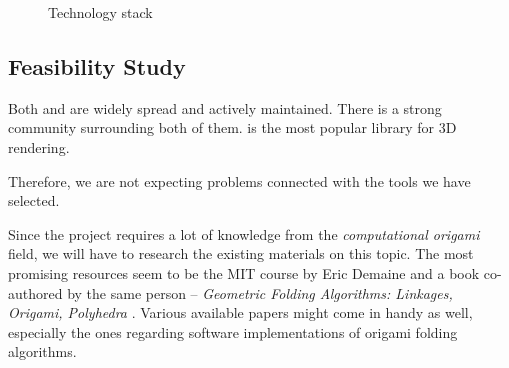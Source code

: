 \begin{figure}[H]
	\caption{Technology stack}
	\centering
\end{figure}


\subsection{Feasibility Study}

Both  and  are widely spread and actively maintained.
There is a strong community surrounding both of them.
 is the most popular library for 3D  rendering.

Therefore, we are not expecting problems connected with the tools we have selected.

Since the project requires a lot of knowledge from the \textit{computational origami}
field, we will have to research the existing materials on this topic.
The most promising resources seem to be the MIT course by
Eric Demaine \cite{mit-course} and a book co-authored by the same person -- \textit{Geometric Folding Algorithms: Linkages, Origami, Polyhedra} \cite{origami-book}.
Various available papers might come in handy as well, especially the ones regarding software implementations of origami folding algorithms.


